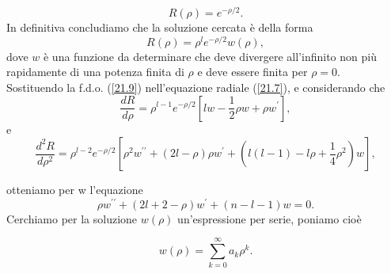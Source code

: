 \documentclass[a4paper,12pt,oneside]{book}
\begin{document}
\begin{equation}
R\left(\rho\right)=e^{-\rho/2} .
\end{equation}
In definitiva concludiamo che la soluzione cercata è della forma
\begin{equation}
R\left(\rho\right)=\rho^le^{-\rho/2}w\left(\rho\right) ,
\label{21.9}
\end{equation}
dove $w$ è una funzione da determinare che deve divergere all'infinito non più rapidamente di una potenza finita di $\rho$ e deve essere finita per $\rho=0$.\\
Sostituendo la f.d.o. (\ref{21.9}) nell'equazione radiale (\ref{21.7}), e considerando che 
\begin{equation}
\frac{dR}{d\rho}=\rho^{l-1}e^{-\rho/2}[lw-\frac{1}{2}\rho w+\rho w^\prime] ,
\end{equation}
e
\begin{equation}
\frac{d^2R}{d\rho^2}=\rho^{l-2}e^{-\rho/2}\left[\rho^2w^{\prime\prime}+\left(2l-\rho\right)\rho w^\prime+\left(l\left(l-1\right)-l\rho+\frac{1}{4}\rho^2\right)w\right] ,
\end{equation}

otteniamo per w l'equazione
\begin{equation}
\rho w^{\prime\prime}+\left(2l+2-\rho\right)w^\prime+\left(n-l-1\right)w=0 .
\end{equation}
Cerchiamo per la soluzione $w\left(\rho\right)$ un'espressione per serie, poniamo cioè 

\begin{equation}
w\left(\rho\right)=\sum_{k=0}^\infty a_k \rho^k .
\end{equation}
\end{document}
